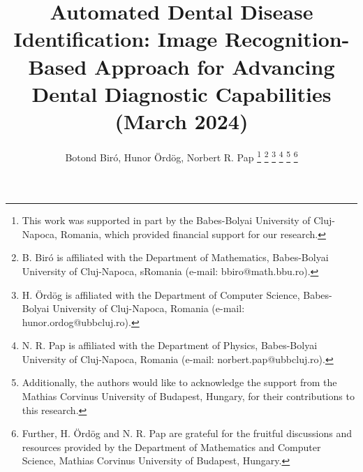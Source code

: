 \documentclass[journal,twoside,web]{ieeecolor}
\begin{document}
\title{Automated Dental Disease Identification: Image Recognition-Based Approach for Advancing Dental Diagnostic Capabilities (March 2024)}

\author{Botond Biró, Hunor Ördög, Norbert R. Pap
    \thanks{This work was supported in part by the Babes-Bolyai University of Cluj-Napoca, Romania, which provided financial support for our research.}
    \thanks{B. Biró is affiliated with the Department of Mathematics, Babes-Bolyai University of Cluj-Napoca, sRomania (e-mail: bbiro@math.bbu.ro).}
    \thanks{H. Ördög is affiliated with the Department of Computer Science, Babes-Bolyai University of Cluj-Napoca, Romania (e-mail: hunor.ordog@ubbcluj.ro).}
    \thanks{N. R. Pap is affiliated with the Department of Physics, Babes-Bolyai University of Cluj-Napoca, Romania (e-mail: norbert.pap@ubbcluj.ro).}
    \thanks{Additionally, the authors would like to acknowledge the support from the Mathias Corvinus University of Budapest, Hungary, for their contributions to this research.}
    \thanks{Further, H. Ördög and N. R. Pap are grateful for the fruitful discussions and resources provided by the Department of Mathematics and Computer Science, Mathias Corvinus University of Budapest, Hungary.}
}


\maketitle
\end{document}
